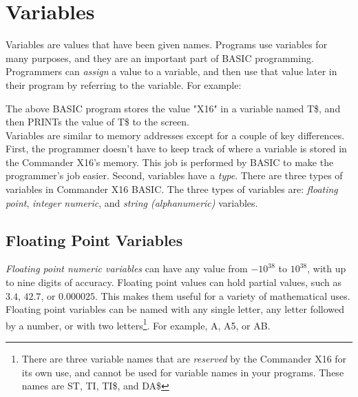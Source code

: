 \section{Variables}

Variables are values that have been given names.  Programs use variables for
many purposes, and they are an important part of BASIC programming.
Programmers can \emph{assign} a value to a variable, and then use that value
later in their program by referring to the variable.  For example:\\


The above BASIC program stores the value {\ttfamily "X16"} in a variable named
{\ttfamily T\$}, and then {\ttfamily PRINT}s the value of {\ttfamily T\$} to
the screen.\\

Variables are similar to memory addresses except for a couple of key
differences.  First, the programmer doesn't have to keep track of where a
variable is stored in the Commander X16's memory.  This job is performed by
BASIC to make the programmer's job easier.  Second, variables have a
\emph{type}.  There are three types of variables in Commander X16 BASIC.  The
three types of variables are: \emph{floating point}, \emph{integer numeric},
and \emph{string (alphanumeric)} variables.\\

\subsection{Floating Point Variables}

\emph{Floating point numeric variables} can have any value from $-10^{38}$ to
$10^{38}$, with up to nine digits of accuracy.  Floating point values can hold
partial values, such as $3.4$, $42.7$, or $0.000025$.  This makes them useful
for a variety of mathematical uses.  Floating point variables can be named with
any single letter, any letter followed by a number, or with two
letters\footnote{There are three variable names that are \emph{reserved} by the
Commander X16 for its own use, and cannot be used for variable names in your
programs.  These names are {\ttfamily ST}, {\ttfamily TI}, {\ttfamily TI\$},
and {\ttfamily DA\$}}.  For example, {\ttfamily A}, {\ttfamily A5}, or
{\ttfamily AB}.\\

